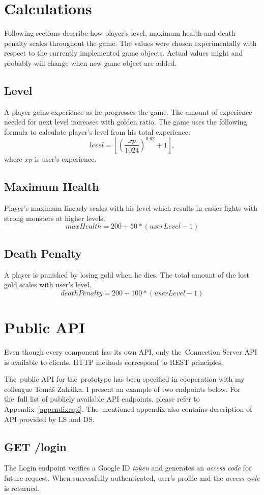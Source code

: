 \section{Calculations}
Following sections describe how player's level, maximum health and death penalty scales throughout the game. The values were chosen experimentally with respect to the currently implemented game objects. Actual values might and probably will change when new game object are added.

	\subsection{Level}
	\label{section:level}
	A player gains experience as he progresses the game. The amount of experience needed for next level increases with golden ratio. The game uses the following formula to calculate player's level from his total experience: 
	\[ level = \left\lfloor{\left(\frac{xp}{1024}\right)^{0.62} + 1}\right\rfloor, \]
	where $xp$ is user's experience.
	\subsection{Maximum Health}
	Player's maximum linearly scales with his level which results in easier fights with strong monsters at higher levels.
	\[ maxHealth = 200 + 50 * (userLevel - 1) \]
	
	\subsection{Death Penalty}
	A player is punished by losing gold when he dies. The total amount of the lost gold scales with user's level.
	\[ deathPenalty = 200 + 100 * (userLevel - 1) \]

\section{Public API}
Even though every component has its own API, only the~Connection Server API is available to clients. HTTP methods correspond to REST principles.

The~public API for the~prototype has been specified in cooperation with my colleague Tomáš Zahálka. I present an example of two endpoints below. For the~full list of publicly available API endpoints, please refer to Appendix~\ref{appendix:api}. The~mentioned appendix also contains description of API provided by LS and DS. 	

	\subsection{GET /login}
		The Login endpoint verifies a Google ID \textit{token} and generates an \textit{access code} for future request. When successfully authenticated, user's profile and the \textit{access code} is returned.
